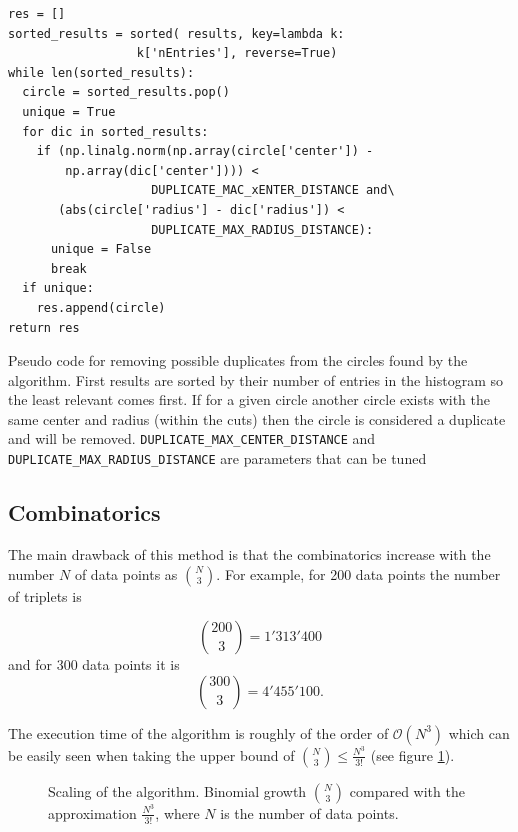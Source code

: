 \documentclass[11pt]{scrreprt}
\begin{document}
\begin{codesnippet}[htb]
\centering
  \begin{lstlisting}
res = []
sorted_results = sorted( results, key=lambda k: 
                  k['nEntries'], reverse=True)
while len(sorted_results):
  circle = sorted_results.pop()
  unique = True
  for dic in sorted_results:
    if (np.linalg.norm(np.array(circle['center']) - 
        np.array(dic['center']))) < 
                    DUPLICATE_MAC_xENTER_DISTANCE and\
       (abs(circle['radius'] - dic['radius']) < 
                    DUPLICATE_MAX_RADIUS_DISTANCE):
      unique = False
      break
  if unique:
    res.append(circle)
return res
\end{lstlisting}
\caption[Pseudo code for removing possible duplicates]{Pseudo code for removing possible duplicates from the circles found by the algorithm. First results are sorted by their number of entries
in the histogram so the least relevant comes first. If for a given circle another circle exists with the same center and radius (within the cuts)
then the circle is considered a duplicate and will be removed. \texttt{DUPLICATE\_MAX\_CENTER\_DISTANCE} and \texttt{DUPLICATE\_MAX\_RADIUS\_DISTANCE} are 
parameters that can be tuned}\label{pc:dup_code}
\end{codesnippet}



\subsection{Combinatorics}
	

The main drawback of this method is that the combinatorics increase with the number $N$ of data points as \( \binom{N}{3} \). 
For example, for 200 data points the number of triplets is

\[ \binom{200}{3} = 1'313'400 \]
and for 300 data points it is
\[ \binom{300}{3} = 4'455'100. \]

The execution time of the algorithm is roughly of the order of $\mathcal{O}(N^3)$ which can be easily seen when taking the upper bound of $\binom{N}{3} \leq \frac{N^3}{3!}$ (see figure \ref{fig:binom_growth}). 
\begin{figure}[ht]
\centering
    \caption[Complexity of the combinatorial triplet Hough transform]{Scaling of the algorithm. Binomial growth $\binom{N}{3}$ compared with the approximation $\frac{N^3}{3!}$, where $N$ is the number of data points.}
  \label{fig:binom_growth}
\end{figure}
\end{document}
